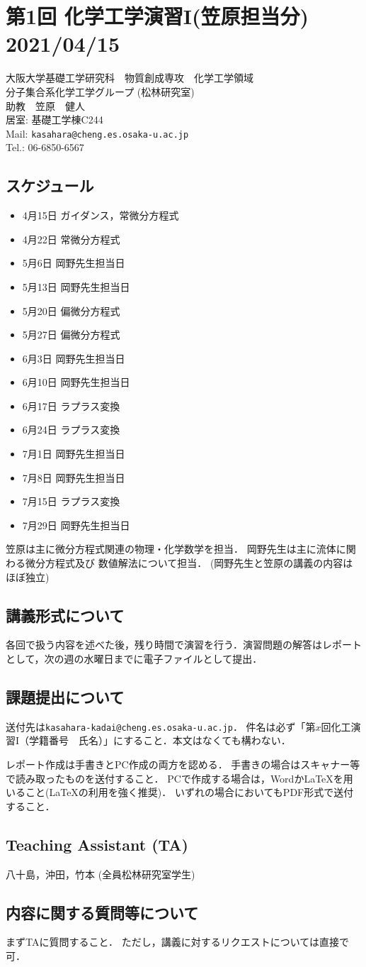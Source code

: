 \documentclass[11pt,a4]{jsarticle}
\numberwithin{equation}{section}
\begin{document}
\section*{第1回 化学工学演習I(笠原担当分) 2021/04/15}
\begin{flushright}
  大阪大学基礎工学研究科　物質創成専攻　化学工学領域\\
  分子集合系化学工学グループ (松林研究室) \\
  助教　笠原　健人 \\
  居室: 基礎工学棟C244 \\
  Mail: \verb|kasahara@cheng.es.osaka-u.ac.jp| \\
  Tel.: 06-6850-6567 
\end{flushright}
%
\subsection*{スケジュール}
%
\begin{itemize}
  \item 4月15日 ガイダンス，常微分方程式
  \item 4月22日 常微分方程式
  \item 5月6日  岡野先生担当日
  \item 5月13日 岡野先生担当日
  \item 5月20日 偏微分方程式
  \item 5月27日 偏微分方程式
  \item 6月3日  岡野先生担当日
  \item 6月10日 岡野先生担当日
  \item 6月17日 ラプラス変換
  \item 6月24日 ラプラス変換
  \item 7月1日  岡野先生担当日
  \item 7月8日  岡野先生担当日
  \item 7月15日 ラプラス変換
  \item 7月29日 岡野先生担当日 
\end{itemize}
%
笠原は主に微分方程式関連の物理・化学数学を担当．
岡野先生は主に流体に関わる微分方程式及び
数値解法について担当．
(岡野先生と笠原の講義の内容はほぼ独立)
%
\subsection*{講義形式について}
%
各回で扱う内容を述べた後，残り時間で演習を行う．演習問題の解答はレポートとして，次の週の水曜日までに電子ファイルとして提出．
%
\subsection*{課題提出について}
%
送付先は\verb|kasahara-kadai@cheng.es.osaka-u.ac.jp|．
件名は必ず「第$x$回化工演習I（学籍番号　氏名）」にすること．本文はなくても構わない．

レポート作成は手書きとPC作成の両方を認める．
手書きの場合はスキャナー等で読み取ったものを送付すること．
PCで作成する場合は，WordかLaTeXを用いること(LaTeXの利用を強く推奨)．
いずれの場合においてもPDF形式で送付すること．
%
\subsection*{Teaching Assistant (TA)}
%
八十島，沖田，竹本 (全員松林研究室学生)
%
\subsection*{内容に関する質問等について}
%
まずTAに質問すること．
ただし，講義に対するリクエストについては直接で可．
\end{document}
